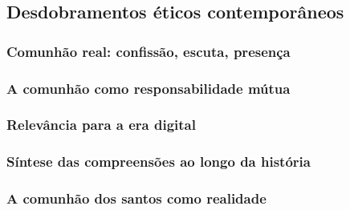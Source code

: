 \subsection{Desdobramentos éticos contemporâneos}
\subsubsection{Comunhão real: confissão, escuta, presença}
\subsubsection{A comunhão como responsabilidade mútua}
\subsubsection{Relevância para a era digital}
\subsubsection{Síntese das compreensões ao longo da história}
\subsubsection{A comunhão dos santos como realidade}
